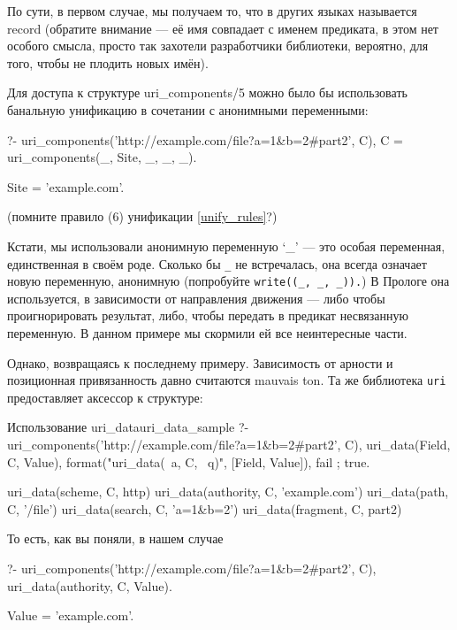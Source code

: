 \documentclass[a4paper]{book}
\begin{document}
По сути, в первом случае, мы получаем то, что в других языках
называется record (обратите внимание --- её имя совпадает с
именем предиката, в этом нет особого смысла, просто так захотели
разработчики библиотеки, вероятно, для того, чтобы не плодить
новых имён).

Для доступа к структуре uri_components/5 можно было бы
использовать банальную унификацию в сочетании с анонимными
переменными:

\begin{example}{}{}
?- uri_components('http://example.com/file?a=1&b=2#part2', C),
   C = uri_components(_, Site, _, _, _).

Site = 'example.com'.
\end{example}

(помните правило (6) унификации \ref{unify_rules}?)

Кстати, мы использовали анонимную переменную `_' --- это особая
переменная, единственная в своём роде. Сколько бы \verb|_| не
встречалась, она всегда означает новую переменную, анонимную
(попробуйте \verb|write((_, _, _)).|) В Прологе она используется,
в зависимости от направления движения --- либо чтобы
проигнорировать результат, либо, чтобы передать в предикат
несвязанную переменную. В данном примере мы скормили ей все
неинтересные части.

Однако, возвращаясь к последнему примеру. Зависимость от арности
и позиционная привязанность давно считаются mauvais ton. Та же
библиотека \verb|uri| предоставляет аксессор к структуре:

\begin{example}{Использование uri_data}{uri_data_sample}
?- uri_components('http://example.com/file?a=1&b=2#part2', C),
   uri_data(Field, C, Value), 
   format("uri_data(~a, C, ~q)\n", [Field, Value]), 
   fail ; true.                                                             

uri_data(scheme, C, http)
uri_data(authority, C, 'example.com')
uri_data(path, C, '/file')
uri_data(search, C, 'a=1&b=2')
uri_data(fragment, C, part2)
\end{example}

То есть, как вы поняли, в нашем случае 

\begin{example}{}{}
?- uri_components('http://example.com/file?a=1&b=2#part2', C),
   uri_data(authority, C, Value).                                           

Value = 'example.com'.
\end{example}
\end{document}
